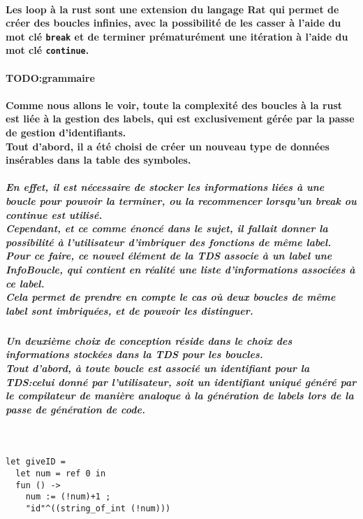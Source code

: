 \documentclass[french]{article}
\begin{document}
\paragraph*{Les loop à la rust sont une extension du langage Rat qui permet de créer des boucles infinies,
avec la possibilité de les casser à l'aide du mot clé \texttt{break} 
et de terminer prématurément une itération à l'aide du mot clé \texttt{continue}.}
\paragraph*{TODO:\@ grammaire}
\paragraph*{Comme nous allons le voir, toute la complexité des boucles à la rust est liée à la gestion des labels, qui est exclusivement gérée par la passe de gestion d'identifiants.\\
Tout d'abord, il a été choisi de créer un nouveau type de données insérables dans la table des symboles.}
\subparagraph*{En effet, il est nécessaire de stocker les informations liées à une boucle pour pouvoir la terminer, ou la recommencer
lorsqu'un break ou continue est utilisé.\\
Cependant, et ce comme énoncé dans le sujet, il fallait donner la possibilité à l'utilisateur d'imbriquer des fonctions de même label.\\
Pour ce faire, ce nouvel élément de la TDS associe à un label une InfoBoucle, qui contient en réalité une liste d'informations associées à ce label.\\
Cela permet de prendre en compte le cas où deux boucles de même label sont imbriquées, et de pouvoir les distinguer. \\} %
\subparagraph*{Un deuxième choix de conception réside dans le choix des informations stockées dans la TDS pour les boucles.\\
Tout d'abord, à toute boucle est associé un identifiant pour la TDS:\@soit celui donné par l'utilisateur, soit un identifiant uniqué généré par le compilateur
de manière analoque à la génération de labels lors de la passe de génération de code.}
\,
\begin{lstlisting}
let giveID = 
  let num = ref 0 in
  fun () ->
    num := (!num)+1 ;
    "id"^((string_of_int (!num)))
\end{lstlisting}
\end{document}
